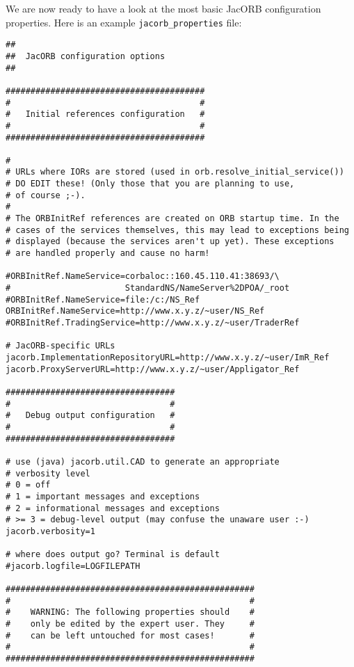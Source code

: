 \documentclass[12pt]{scrbook}
\begin{document}

We are now ready to have a look at the most basic JacORB configuration
properties.  Here is an example {\tt jacorb\_properties} file: 

\renewcommand{\baselinestretch}{0.9}
\small{
\begin{verbatim}
##
##  JacORB configuration options
##

########################################
#                                      #
#   Initial references configuration   #
#                                      #
########################################

#
# URLs where IORs are stored (used in orb.resolve_initial_service())
# DO EDIT these! (Only those that you are planning to use,
# of course ;-). 
#
# The ORBInitRef references are created on ORB startup time. In the 
# cases of the services themselves, this may lead to exceptions being 
# displayed (because the services aren't up yet). These exceptions
# are handled properly and cause no harm! 

#ORBInitRef.NameService=corbaloc::160.45.110.41:38693/\
#                       StandardNS/NameServer%2DPOA/_root
#ORBInitRef.NameService=file:/c:/NS_Ref
ORBInitRef.NameService=http://www.x.y.z/~user/NS_Ref
#ORBInitRef.TradingService=http://www.x.y.z/~user/TraderRef

# JacORB-specific URLs
jacorb.ImplementationRepositoryURL=http://www.x.y.z/~user/ImR_Ref
jacorb.ProxyServerURL=http://www.x.y.z/~user/Appligator_Ref

##################################
#                                #
#   Debug output configuration   #
#                                #
##################################

# use (java) jacorb.util.CAD to generate an appropriate
# verbosity level 
# 0 = off
# 1 = important messages and exceptions
# 2 = informational messages and exceptions
# >= 3 = debug-level output (may confuse the unaware user :-)
jacorb.verbosity=1

# where does output go? Terminal is default
#jacorb.logfile=LOGFILEPATH

##################################################
#                                                #
#    WARNING: The following properties should    # 
#    only be edited by the expert user. They     #
#    can be left untouched for most cases!       #
#                                                #
##################################################


\end{verbatim}}
\end{document}
